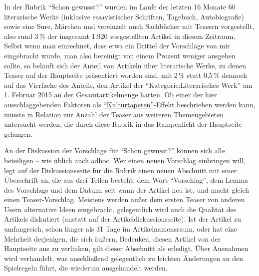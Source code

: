 \documentclass[fontsize=12pt]{scrartcl}
\begin{document}
In der Rubrik "`Schon gewusst?"' wurden im Laufe der letzten 16 Monate 60 li\-te\-ra\-rische Werke (inklusive essayistischer Schriften, Tagebuch, Autobiografie) sowie eine Sure, M\"archen und vereinzelt auch Sachb\"ucher mit Teasern vorgestellt, also rund 3\,\% der insgesamt 1.920 vorgestellten Artikel in diesem Zeitraum. \mbox{Selbst} wenn man einrechnet, dass etwa ein Drittel der Vorschl\"age von mir eingebracht wurde, man also bereinigt von einem Prozent weniger ausgehen sollte, so bel\"auft sich der Anteil von Artikeln \"uber li\-te\-ra\-rische Werke, zu denen Teaser auf der Hauptseite pr\"asentiert worden sind, mit 2\,\% statt 0,5\,\% dennoch auf das Vier\-fache des Anteils, den Artikel der "`Kategorie:Li\-te\-ra\-risches Werk"' am 1. Februar 2015 an der Gesamtartikelmenge hatten. Ob einer der \mbox{hier} ausschlaggebenden Faktoren als \href{https://de.wikipedia.org/w/index.php?title=Wikipedia_Diskussion:Kurier&diff=prev&oldid=138042996}{
"`Kulturtapeten"'}-Effekt beschrieben werden kann, m\"usste in Relation zur Anzahl der Teaser aus weiteren Themengebieten untersucht werden, die durch diese Rubrik in das Rampenlicht der Hauptseite gelangen.

An der Dis\-kus\-si\-on der Vorschl\"age f\"ur "`Schon gewusst?"' k\"onnen sich alle beteiligen -- wie \"ublich auch adhoc. Wer einen neuen Vorschlag einbringen will, legt auf der Dis\-kus\-si\-onsseite f\"ur die Rubrik einen neuen Abschnitt mit einer \"Uberschrift an, die aus drei Teilen be\-steht: dem Wort "`Vorschlag"', dem Lemma des Vorschlags und dem Datum, seit wann der Artikel neu ist, und macht gleich einen Teaser-Vorschlag. Meistens werden au{\ss}er dem ersten Teaser von anderen Usern alternative Ideen eingebracht, gelegentlich wird auch die Qualit\"at des Artikels diskutiert (anstatt auf der Artikeldis\-kus\-si\-onsseite). Ist der Artikel zu umfangreich, schon l\"anger als 31 Tage im Artikelnamensraum, oder hat eine Mehrheit derjenigen, die sich \"au{\ss}ern, Bedenken, diesen Artikel von der Hauptseite aus zu verlinken, gilt dieser Abschnitt als erledigt. \"Uber Ausnahmen wird verhandelt, was anschlie{\ss}end gelegentlich zu leichten \"Anderungen an den Spielregeln f\"uhrt, die wiederum ausgehandelt werden. 
\end{document}
